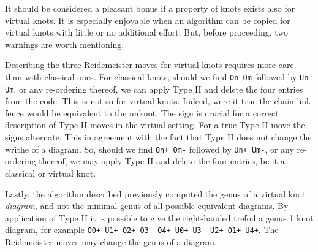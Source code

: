         \par\hfill\par
        It should be considered a pleasant bonus if a property of knots exists
        also for virtual knots. It is especially enjoyable when an
        algorithm can be copied for virtual knots with little or no additional
        effort. But, before proceeding, two warnings are worth mentioning.
        \par\hfill\par
        Describing the three Reidemeister moves for virtual knots requires more
        care than with classical ones. For classical knots, should we find
        \texttt{On Om} followed by \texttt{Un Um}, or any re-ordering thereof,
        we can apply Type II and delete the four entries from the code. This is
        not so for virtual knots. Indeed, were it true the chain-link fence
        would be equivalent to the unknot. The sign is crucial for a correct
        description of Type II moves in the virtual setting. For a true
        Type II move the signs alternate. This in agreement with the fact that
        Type II does not change the writhe of a diagram. So, should we find
        \texttt{On+ Om-} followed by \texttt{Un+ Um-}, or any re-ordering
        thereof, we may apply Type II and delete the four entries, be it a
        classical or virtual knot.
        \par\hfill\par
        Lastly, the algorithm described previously computed the genus of a
        virtual knot \textit{diagram}, and not the minimal genus of all
        possible equivalent diagrams. By application of Type II it is possible
        to give the right-handed trefoil a genus 1 knot diagram, for example
        \texttt{O0+ U1+ O2+ O3- O4+ U0+ U3- U2+ O1+ U4+}. The Reidemeister
        moves may change the genus of a diagram.
